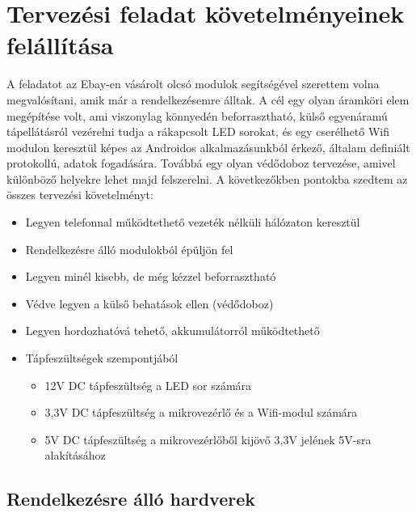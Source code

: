 \documentclass[../main.tex]{subfiles}
\begin{document}
\section{Tervezési feladat követelményeinek felállítása}
    A feladatot az Ebay-en vásárolt olcsó modulok segítségével szerettem volna megvalósítani, amik már a rendelkezésemre álltak. A cél egy olyan áramköri elem megépítése volt, ami viszonylag könnyedén beforrasztható, külső egyenáramú tápellátásról vezérelni tudja a rákapcsolt LED sorokat, és egy cserélhető Wifi modulon keresztül képes az Androidos alkalmazásunkból érkező, általam definiált protokollú, adatok fogadására. Továbbá egy olyan védődoboz tervezése, amivel különböző helyekre lehet majd felszerelni. A következőkben pontokba szedtem az összes tervezési követelményt:
 
        \begin{itemize}
            \item Legyen telefonnal működtethető vezeték nélküli hálózaton keresztül
            \item Rendelkezésre álló modulokból épüljön fel
            \item Legyen minél kisebb, de még kézzel beforrasztható
            \item Védve legyen a külső behatások ellen (védődoboz)
            \item Legyen hordozhatóvá tehető, akkumulátorról működtethető
            \item Tápfeszültségek szempontjából
                 \begin{itemize}
                    \item 12V DC tápfeszültség a LED sor számára
                    \item 3,3V DC tápfeszültség a mikrovezérlő és a Wifi-modul számára
                    \item 5V DC tápfeszültség a mikrovezérlőből kijövő 3,3V jelének 5V-sra alakításához
                \end{itemize}
        \end{itemize}
    
    
    \subsection{Rendelkezésre álló hardverek}
\end{document}

